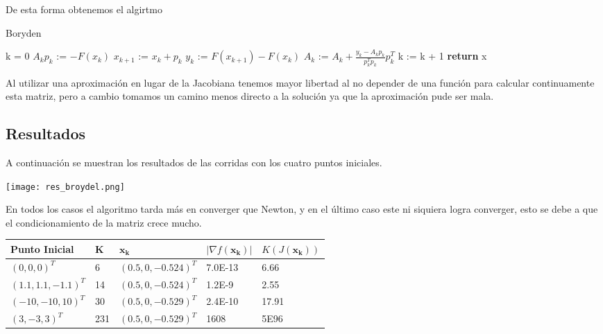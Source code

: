 \documentclass{article}
\begin{document}
\begin{multicols}{2}
De esta forma obtenemos el algirtmo
\begin{algorithm}[H]
\caption{Boryden}\label{broydel}
\begin{algorithmic}[1]
  \State k = 0
    \State $A_kp_k$ := $-F(x_k)$
    \State $x_{k+1}$ := $x_k + p_k$
    \State $y_k$ := $F(x_{k+1}) - F(x_k)$
    \State $A_k$ := $A_k + \frac{y_k - A_k p_k}{p_k^Tp_k}p_k^T$
    \State k := k + 1
  \EndWhile
  \State\textbf{return} x
\EndFunction
\end{algorithmic}
\end{algorithm}

Al utilizar una aproximación en lugar de la Jacobiana tenemos mayor libertad al no depender de una función para calcular continuamente esta matriz, pero a cambio tomamos un camino menos directo a la solución ya que la aproximación pude ser mala.

\subsection{Resultados}

A continuación se muestran los resultados de las corridas con los cuatro puntos iniciales.

\texttt{[image: res\_broydel.png]}

En todos los casos el algoritmo tarda más en converger que Newton, y en el último caso este ni siquiera logra converger, esto se debe a que el condicionamiento de la matriz crece mucho.

\begin{table}[H]
\footnotesize
\centering
\label{broyden}
\begin{tabular}{|l|l|l|l|l|}
\hline
Punto Inicial      & K & $\boldsymbol{x_k}$    & $|\nabla f(\boldsymbol{x_k})|$ & $K(J(\boldsymbol{x_k}))$ \\ \hline
$(0,0,0)^T$        & 6 &  $(0.5, 0, -0.524)^T$ & 7.0E-13        &   6.66                     \\ \hline
$(1.1,1.1,-1.1)^T$ & 14&  $(0.5, 0, -0.524)^T$ & 1.2E-9        &    2.55                  \\ \hline
$(-10, -10 , 10)^T$& 30&  $(0.5, 0, -0.529)^T$ & 2.4E-10        &   17.91                  \\ \hline
$(3, -3 , 3)^T$    &231 &  $(0.5, 0, -0.529)^T$ & 1608       &    5E96                 \\ \hline
\end{tabular}
\end{table}


\end{multicols}
\end{document}
